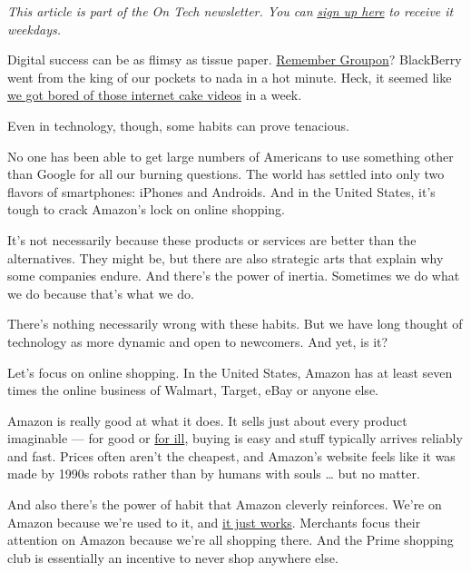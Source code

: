 \emph{This article is part of the On Tech newsletter. You can}
\href{https://www.nytimes3xbfgragh.onion/newsletters/signup/OT}{\emph{sign
up here}} \emph{to receive it weekdays.}

Digital success can be as flimsy as tissue paper.
\href{https://www.forbes.com/forbes/2010/0830/entrepreneurs-groupon-facebook-twitter-next-web-phenom.html\#568f5cee4c2e}{Remember
Groupon}? BlackBerry went from the king of our pockets to nada in a hot
minute. Heck, it seemed like
\href{https://www.nbcnews.com/pop-culture/pop-culture-news/internet-went-crazy-over-cake-going-mainstream-can-end-trend-n1234588}{we
got bored of those internet cake videos} in a week.

Even in technology, though, some habits can prove tenacious.

No one has been able to get large numbers of Americans to use something
other than Google for all our burning questions. The world has settled
into only two flavors of smartphones: iPhones and Androids. And in the
United States, it's tough to crack Amazon's lock on online shopping.

It's not necessarily because these products or services are better than
the alternatives. They might be, but there are also strategic arts that
explain why some companies endure. And there's the power of inertia.
Sometimes we do what we do because that's what we do.

There's nothing necessarily wrong with these habits. But we have long
thought of technology as more dynamic and open to newcomers. And yet, is
it?

Let's focus on online shopping. In the United States, Amazon has at
least seven times the online business of Walmart, Target, eBay or anyone
else.

Amazon is really good at what it does. It sells just about every product
imaginable --- for good or
\href{https://www.nytimes3xbfgragh.onion/2020/07/09/technology/facebook-crisis.html}{for
ill}, buying is easy and stuff typically arrives reliably and fast.
Prices often aren't the cheapest, and Amazon's website feels like it was
made by 1990s robots rather than by humans with souls \ldots{} but no
matter.

And also there's the power of habit that Amazon cleverly reinforces.
We're on Amazon because we're used to it, and
\href{https://www.nytimes3xbfgragh.onion/2020/04/27/technology/no-the-best-doesnt-win.html}{it
just works}. Merchants focus their attention on Amazon because we're all
shopping there. And the Prime shopping club is essentially an incentive
to never shop anywhere else.

